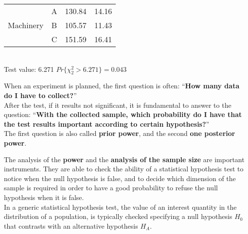 \begin{frame}
\begin{footnotesize}
\begin{tabular}{|c|c|r|r|}
      & \multicolumn{1}{|c|}{\hspace*{.5cm}A\hspace*{.5cm}} & \multicolumn{1}{|r|}{130.84} & \multicolumn{1}{|r|}{14.16}\\ \cline{2-4}
      \multicolumn{1}{|c|}{Machinery} & \multicolumn{1}{|c|}{B} & \multicolumn{1}{|r|}{105.57} & \multicolumn{1}{|r|}{11.43}\\ \cline{2-4}
      & \multicolumn{1}{|c|}{C} & \multicolumn{1}{|r|}{151.59} & \multicolumn{1}{|r|}{16.41}\\ \hline
    \end{tabular}\\
    \vspace*{.5cm}
    Test value: 6.271 \hspace*{1cm} $Pr\{\chi_2^2>6.271\}=0.043$
  \end{footnotesize}
\end{frame}




\begin{frame}
  \vspace*{.5cm}
  When an experiment is planned, the first question is often: ``\textbf{How many data do I have to collect?}''\\
  \vspace*{.25cm}
  After the test, if it results not significant, it is fundamental to answer to the question: ``\textbf{With the collected sample, which probability do I have that the test results important according to certain hypothesis?}'' \\
  \vspace*{.75cm}
  The first question is also called \textbf{prior power}, and the second \textbf{one posterior power}.
\end{frame}

\begin{frame}
  \vspace*{.25cm}
  The analysis of the \textbf{power} and the \textbf{analysis of the sample size} are important instruments. They are able to check the ability of a statistical hypothesis test to notice when the null hypothesis is false, and to decide which dimension of the sample is required in order to have a good probability to refuse the null hypothesis when it is false.\\
  \vspace*{.75cm}
  In a generic statistical hypothesis test, the value of an interest quantity in the distribution of a population, is typically checked specifying a null hypothesis $ H_0 $ that contrasts with an alternative hypothesis $ H_A $.
\end{frame}


